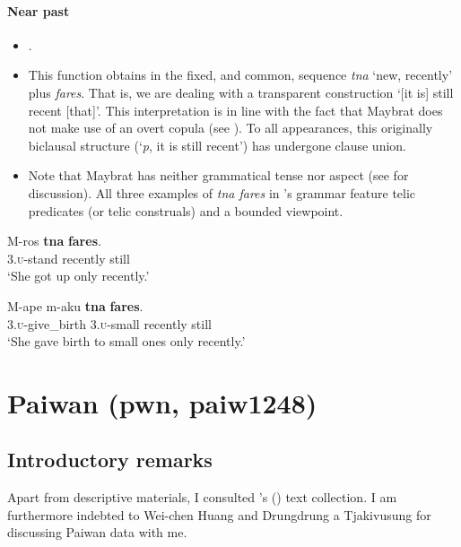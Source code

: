 \paragraph{Near past}\label{appendixMaybratImmediatePast}
\begin{itemize}
	\item \textcite[161, 184]{Dol2007}.
	\item This function obtains in the fixed, and common, sequence \textit{tna} \lq new, recently' plus \textit{fares}. That is, we are dealing with a transparent construction \lq [it is] still recent [that]'. This interpretation is in line with the fact that Maybrat does not make use of an overt copula (see \cite[147–148]{Dol2007}). To all appearances, this originally biclausal structure (\lq \textit{p}, it is still recent\rq{}) has undergone clause union.
	\item Note that Maybrat has neither grammatical tense nor aspect (see \cite{Dahl2011} for discussion). All three examples of \textit{tna fares} in \citeauthor{Dol2007}'s grammar feature telic predicates (or telic construals) and a bounded viewpoint.
\end{itemize}

\begin{exe}
	\ex
	\gll M-ros \textbf{tna} \textbf{fares}.\\
	3.\textsc{u}-stand recently still\\
	\glt \lq She got up only recently.' \parencite[161]{Dol2007}
	
	\ex
	\gll M-ape m-aku \textbf{tna} \textbf{fares}.\\
	3.\textsc{u}-give\_birth 3.\textsc{u}-small recently still\\
	\glt \lq She gave birth to small ones only recently.' \parencite[161]{Dol2007}
\end{exe}
	
\section{Paiwan (pwn, paiw1248)}
\label{appendixPaiwan}

\subsection{Introductory remarks}
Apart from descriptive materials, I consulted \citeauthor{EarlyWhitehorn2003}'s (\citeyear{EarlyWhitehorn2003}) text collection. I am furthermore indebted to Wei-chen Huang and Drungdrung a Tjakivusung for discussing Paiwan data with me.

